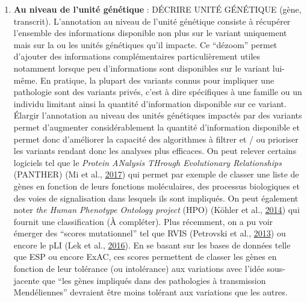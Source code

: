 \documentclass[12pt,twoside]{reedthesis}
\providecommand{\tightlist}{%
  \setlength{\itemsep}{0pt}\setlength{\parskip}{0pt}}
\theoremstyle{definition}
\theoremstyle{definition}
\theoremstyle{remark}
\begin{document}
  \begin{enumerate}
  \def\labelenumi{\arabic{enumi}.}
  \setcounter{enumi}{1}
  \tightlist
  \item
    \textbf{Au niveau de l'unité génétique} : DÉCRIRE UNITÉ GÉNÉTIQUE
    (gène, transcrit). L'annotation au niveau de l'unité génétique
    consiste à récupérer l'ensemble des informations disponible non plus
    sur le variant uniquement mais sur la ou les unités génétiques qu'il
    impacte. Ce ``dézoom'' permet d'ajouter des informations
    complémentaires particulièrement utiles notamment lorsque peu
    d'informations sont disponibles sur le variant lui-même. En pratique,
    la plupart des variants connus pour impliquer une pathologie sont des
    variants privés, c'est à dire spécifiques à une famille ou un individu
    limitant ainsi la quantité d'information disponible sur ce variant.
    Élargir l'annotation au niveau des unités génétiques impactés par des
    variants permet d'augmenter considérablement la quantité d'information
    disponible et permet donc d'améliorer la capacité des algorithmes à
    filtrer et / ou prioriser les variants rendant donc les analyses plus
    efficaces. On peut relever certains logiciels tel que le \emph{Protein
    ANalysis THrough Evolutionary Relationships} (PANTHER) (Mi et al.,
    \protect\hyperlink{ref-Mi2017}{2017}) qui permet par exemple de
    classer une liste de gènes en fonction de leurs fonctions
    moléculaires, des processus biologiques et des voies de signalisation
    dans lesquels ils sont impliqués. On peut également noter \emph{the
    Human Phenotype Ontology project} (HPO) (Köhler et al.,
    \protect\hyperlink{ref-Kohler2014}{2014}) qui fournit une
    classification (À compléter). Plus récemment, on a pu voir émerger des
    ``scores mutationnel'' tel que RVIS (Petrovski et al.,
    \protect\hyperlink{ref-Petrovski2013}{2013}) ou encore le pLI (Lek et
    al., \protect\hyperlink{ref-Lek2016}{2016}). En se basant sur les
    bases de données telle que ESP ou encore ExAC, ces scores permettent
    de classer les gènes en fonction de leur tolérance (ou intolérance)
    aux variations avec l'idée sous-jacente que ``les gènes impliqués dans
    des pathologies à transmission Mendéliennes'' devraient être moins
    tolérant aux variations que les autres.
  \end{enumerate}
  
\end{document}
